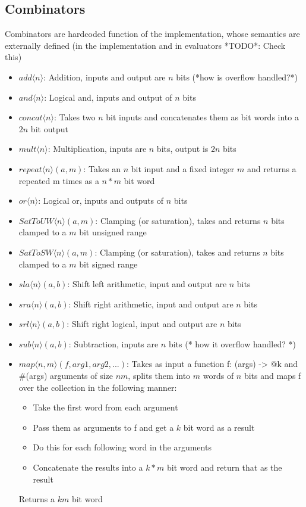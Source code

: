 \documentclass{article}
\begin{document}
  \subsection{Combinators}
  Combinators are hardcoded function of the implementation, whose semantics are
  externally defined (in the implementation and in evaluators *TODO*: Check this)
  \begin{itemize}
  \item $add\langle n \rangle$: Addition, inputs and output are $n$ bits (*how is
    overflow handled?*)
  \item $and\langle n \rangle$: Logical and, inputs and output of $n$ bits
  \item $concat\langle n \rangle$: Takes two $n$ bit inputs and concatenates them as bit words
    into a $2n$ bit output
  \item $mult\langle n \rangle$: Multiplication, inputs are $n$ bits, output is
    $2n$ bits
  \item $repeat\langle n \rangle(a, m)$: Takes an $n$ bit input and a fixed
    integer $m$ and returns a repeated m times as a $n*m$ bit word
  \item $or\langle n \rangle$: Logical or, inputs and outputs of $n$ bits
  \item $SatToUW\langle n \rangle(a,m)$: Clamping (or saturation), takes and
    returns $n$ bits clamped to a $m$ bit unsigned range
  \item $SatToSW\langle n \rangle(a,m)$: Clamping (or saturation), takes and
    returns $n$ bits clamped to a $m$ bit signed range
  \item $sla\langle n \rangle(a, b)$: Shift left arithmetic, input and output
    are $n$ bits
  \item $sra\langle n \rangle(a, b)$: Shift right arithmetic, input and output
    are $n$ bits
  \item $srl\langle n \rangle(a, b)$: Shift right logical, input and output are
    $n$ bits
  \item $sub\langle n \rangle(a, b)$: Subtraction, inputs are $n$ bits (* how it
    overflow handled? *)
  \item $map\langle n,m \rangle(f, arg1, arg2, ...)$: Takes as input a function
    f: (args) -> @k and \#(args) arguments of size $nm$, splits them into $m$
    words of $n$ bits and maps f over the collection in the following manner:
    \begin{itemize}
    \item Take the first word from each argument
    \item Pass them as arguments to f and get a $k$ bit word as a result
    \item Do this for each following word in the arguments
    \item Concatenate the results into a $k*m$ bit word and return that as the
      result
    \end{itemize}
    Returns a $km$ bit word
  \end{itemize}
  
\end{document}
